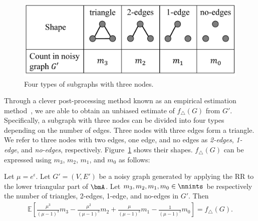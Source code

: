 \begin{figure}
\centering
\includegraphics[width=0.9\linewidth]{fig/triplet_shape.pdf}

\caption{Four types of subgraphs with three nodes.}
\label{chap1-fig:triplet_shape}
\end{figure}

Through 
a 
clever post-processing 
method 
known as an empirical estimation method~\cite{Kairouz_ICML16,Murakami_USENIX19,Wang_USENIX17},
we are able to obtain an unbiased estimate of $f_\triangle(G)$ 
from $G'$. 
Specifically, a subgraph with three nodes can be divided into four types depending on the number of edges. 
Three nodes with three edges form a triangle. 
We refer to three nodes with two edges, one edge, and no edges as \textit{2-edges},  \textit{1-edge}, and  \textit{no-edges}, respectively. 
Figure~\ref{chap1-fig:triplet_shape} shows their shapes. 
$f_\triangle(G)$ can be expressed using $m_3$, $m_2$, $m_1$, and $m_0$ as follows:

\begin{proposition}\label{chap1-prop:triangle_emp}
  Let $\mu = e^\epsilon$. 
  Let $G'=(V,E')$ be a noisy graph generated by applying the RR to the lower triangular part of $\bmA$.
  Let $m_3, m_2, m_1, m_0 \in \nnints$ be respectively the number of triangles, 2-edges, 1-edge, and no-edges in $G'$. 
  Then 
  \begin{align}
      \textstyle{\mathbb{E}\left[\frac{\mu^3}{(\mu-1)^3}m_3 - \frac{\mu^2}{(\mu-1)^3} m_2 + \frac{\mu}{(\mu-1)^3} m_1 - \frac{1}{(\mu-1)^3} m_0 \right] = f_\triangle(G).}
      \label{chap1-eq:triangle_emp}
  \end{align}
\end{proposition}

